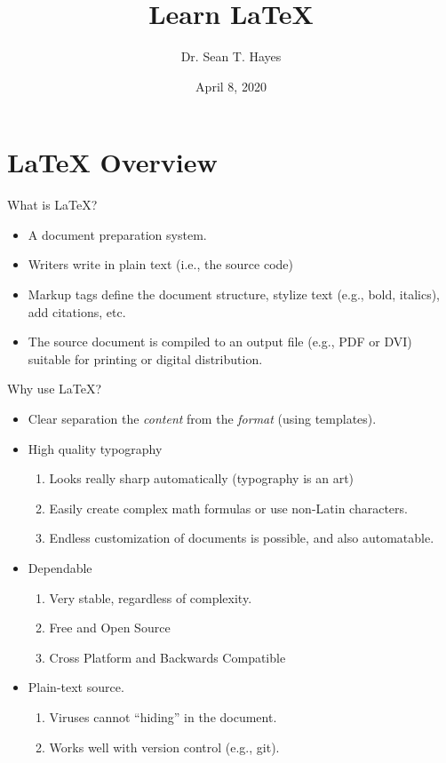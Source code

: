 \documentclass[english,aspectratio=169,14pt]{beamer}
\title{Learn \LaTeX}
\author{Dr. Sean T. Hayes }
\date{April 8, 2020}
\institute[CSU]{Charleston Southern University}
\begin{document}
\begin{frame}
    \maketitle
\end{frame}

\section{\LaTeX{} Overview}

\begin{frame}{What is \LaTeX{}?}
    \begin{itemize}
        \item A document preparation system.
        \item Writers write in plain text (i.e., the source code)
        \item Markup tags define the document structure, stylize text (e.g., bold, italics), add citations, etc.
        \item The source document is compiled to an output file (e.g., PDF or DVI) suitable for printing or digital distribution.
    \end{itemize}
\end{frame}

\begin{frame}{Why use \LaTeX{}?}
    \begin{itemize}
        \item<1-> Clear separation the \emph{content} from the \emph{format} (using templates).

        \item<2-> High quality typography
        \begin{enumerate}
            \item Looks really sharp automatically (typography is an art)
            \item Easily create complex math formulas or use non-Latin characters.
            \item Endless customization of documents is possible, and also automatable.
        \end{enumerate}

        \item<3-> Dependable
        \begin{enumerate}
            \item Very stable, regardless of complexity.
            \item Free and Open Source
            \item Cross Platform and Backwards Compatible
        \end{enumerate}

        \item<4-> Plain-text source.
        \begin{enumerate}
            \item Viruses cannot ``hiding'' in the document.
            \item Works well with version control (e.g., git).
        \end{enumerate}
    \end{itemize}
\end{frame}
\end{document}
